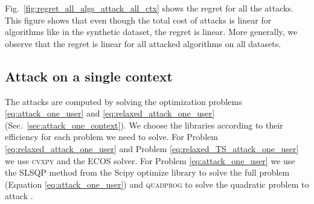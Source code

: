 Fig.~\ref{fig:regret_all_algs_attack_all_ctx} shows the regret for all the attacks. This figure shows that even though the total cost of attacks is linear for algorithms like \lints in the synthetic dataset, the regret is linear. More generally, we observe that the regret is linear for all attacked algorithms on all datasets.

\subsection{Attack on a single context}\label{app:additional_fig_one_ctx}

The attacks are computed by solving the optimization problems \ref{eq:attack_one_user} and \ref{eq:relaxed_attack_one_user} (Sec.~\ref{sec:attack_one_context}). We choose the libraries according to their efficiency for each problem we need to solve. For Problem \eqref{eq:relaxed_attack_one_user} and Problem \eqref{eq:relaxed_TS_attack_one_user} we use \textsc{cvxpy}  \cite{cvxpy_rewriting} and the \textsc{ECOS} solver. %
For Problem \eqref{eq:attack_one_user} we use the \textsc{SLSQP} method from the Scipy optimize library \cite{scipy} to solve the full \linucb problem (Equation \ref{eq:attack_one_user}) and \textsc{quadprog} to solve the quadratic problem to attack \epsgreedy.


